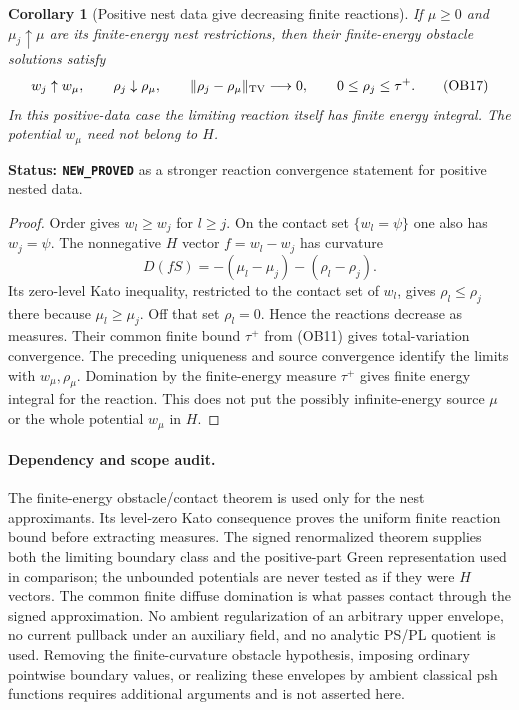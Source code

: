 \documentclass[11pt,a4paper]{article}
\numberwithin{equation}{section}
\newtheorem{corollary}[theorem]{Corollary}
\theoremstyle{definition}
\theoremstyle{remark}
\begin{document}
\begin{corollary}[Positive nest data give decreasing finite reactions]
\label{cor:r11-positive-obstacle-reaction-TV}
If $\mu\ge0$ and $\mu_j\uparrow\mu$ are its finite-energy nest
restrictions, then their finite-energy obstacle solutions satisfy
\[
       w_j\uparrow w_\mu,\qquad
       \rho_j\downarrow\rho_\mu,\qquad
       \|\rho_j-\rho_\mu\|_{\rm TV}\longrightarrow0,\qquad
       0\le\rho_j\le\tau^+.
 \tag{OB17}
\]
In this positive-data case the limiting reaction itself has finite
energy integral.  The potential $w_\mu$ need not belong to $H$.
\end{corollary}

\noindent\textbf{Status: \texttt{NEW\_PROVED}} as a stronger
reaction convergence statement for positive nested data.

\begin{proof}
Order gives $w_l\ge w_j$ for $l\ge j$.  On the contact set
$\{w_l=\psi\}$ one also has $w_j=\psi$.
The nonnegative $H$ vector $f=w_l-w_j$ has curvature
\[
                         D(fS)=-(\mu_l-\mu_j)-(\rho_l-\rho_j).
\]
Its zero-level Kato inequality, restricted to the contact set of
$w_l$, gives $\rho_l\le\rho_j$ there because $\mu_l\ge\mu_j$.
Off that set $\rho_l=0$.  Hence the reactions decrease as measures.
Their common finite bound $\tau^+$ from (OB11) gives total-variation
convergence.  The preceding uniqueness and source convergence identify
the limits with $w_\mu,\rho_\mu$.  Domination by the finite-energy
measure $\tau^+$ gives finite energy integral for the reaction.
This does not put the possibly infinite-energy source $\mu$ or the
whole potential $w_\mu$ in $H$.
\end{proof}

\paragraph{Dependency and scope audit.}
The finite-energy obstacle/contact theorem is used only for the nest
approximants.  Its level-zero Kato consequence proves the uniform
finite reaction bound before extracting measures.  The signed
renormalized theorem supplies both the limiting boundary class and
the positive-part Green representation used in comparison; the
unbounded potentials are never tested as if they were $H$ vectors.
The common finite diffuse domination is what passes contact through
the signed approximation.  No ambient regularization of an arbitrary
upper envelope, no current pullback under an auxiliary field, and no
analytic PS/PL quotient is used.  Removing the finite-curvature
obstacle hypothesis, imposing ordinary pointwise boundary values, or
realizing these envelopes by ambient classical psh functions requires
additional arguments and is not asserted here.
\end{document}
